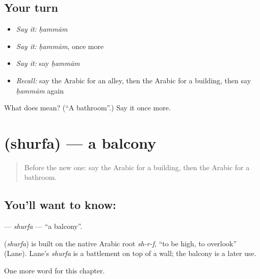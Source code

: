 \subsection*{Your turn}
\begin{itemize}
\raggedright
  \item \emph{Say it:} \emph{ḥammām}
  \item \emph{Say it:} \emph{ḥammām}, once more
  \item \emph{Say it:} say \emph{ḥammām}
  \item \emph{Recall:} say the Arabic for an alley, then the Arabic for a building, then say \emph{ḥammām} again
\end{itemize}

\begin{tcolorbox}[breakable,colback=teal!4,colframe=teal!35!black,title={Before you move on}]
What does  mean? (\textquotedblleft{}A bathroom\textquotedblright{}.) Say it once more.
\end{tcolorbox}
\section[\texorpdfstring{\ar{شرفة} (shurfa)}{شرفة (shurfa)}]{ (shurfa) — a balcony}

\label{lesson:AR-C101-shurfa}



\begin{quote}
Before the new one: say the Arabic for a building, then the Arabic for a bathroom.
\end{quote}

\subsection*{You'll want to know: }
\textbf{} — \emph{shurfa} — \textquotedblleft{}a balcony\textquotedblright{}.

\begin{cousinweb}
\textbf{} (\emph{shurfa}) is built on the native Arabic root \emph{sh-r-f}, \textquotedblleft{}to be high, to overlook\textquotedblright{} (Lane). Lane's \emph{shurfa} is a battlement on top of a wall; the balcony is a later use.
\end{cousinweb}

\begin{grammarlens}[title={What you've built}]
One more word for this chapter.
\end{grammarlens}

